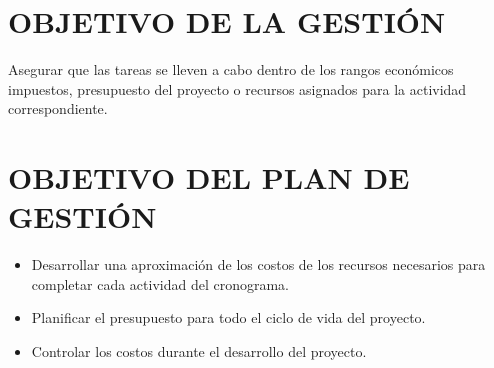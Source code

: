 \chapter{OBJETIVO DE LA GESTI\'ON}
Asegurar que las tareas se lleven a cabo dentro de los rangos econ\'omicos impuestos, presupuesto del proyecto o
recursos asignados para la actividad correspondiente.%

\chapter{OBJETIVO DEL PLAN DE GESTI\'ON}
\begin{itemize}
	\item Desarrollar una aproximaci\'on de los costos de los recursos necesarios para completar cada actividad del
	 cronograma.
	\item Planificar el presupuesto para todo el ciclo de vida del proyecto.
	\item Controlar los costos durante el desarrollo del proyecto.
\end{itemize}